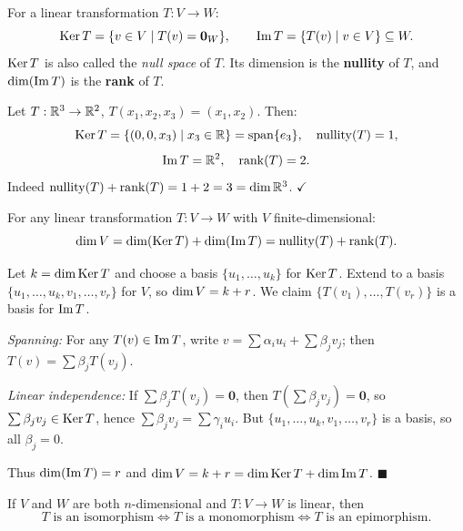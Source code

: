 \begin{defbox}
\label{def:lt-ker-img}
For a linear transformation $T:V\to W$:
\[
    \operatorname{Ker} T = \{v\in V \mid T(v)=\mathbf{0}_W\}, \qquad
    \operatorname{Im} T  = \{T(v) \mid v\in V\} \subseteq W.
\]
$\operatorname{Ker} T$ is also called the \emph{null space} of $T$.  Its dimension is the
\textbf{nullity} of $T$, and $\operatorname{dim}(\operatorname{Im} T)$ is the \textbf{rank} of $T$.
\end{defbox}

\begin{exbox}
Let $T:\mathbb{R}^3\to\mathbb{R}^2$, $T(x_1,x_2,x_3)=(x_1,x_2)$.  Then:
\[
    \operatorname{Ker} T = \{(0,0,x_3)\mid x_3\in\mathbb{R}\} = \operatorname{span}\{e_3\},
    \quad \operatorname{nullity}(T)=1,
\]
\[
    \operatorname{Im} T = \mathbb{R}^2, \quad \operatorname{rank}(T)=2.
\]
Indeed $\operatorname{nullity}(T)+\operatorname{rank}(T)=1+2=3=\operatorname{dim}\mathbb{R}^3$. $\checkmark$
\end{exbox}

\begin{thmbox}
\label{thm:rank-nullity-lt}
For any linear transformation $T:V\to W$ with $V$ finite-dimensional:
\[
    \operatorname{dim} V = \operatorname{dim}(\operatorname{Ker} T) + \operatorname{dim}(\operatorname{Im} T)
            = \operatorname{nullity}(T) + \operatorname{rank}(T).
\]
\end{thmbox}

\begin{proofbox}
Let $k=\operatorname{dim}\operatorname{Ker} T$ and choose a basis $\{u_1,\ldots,u_k\}$ for $\operatorname{Ker} T$.
Extend to a basis $\{u_1,\ldots,u_k,v_1,\ldots,v_r\}$ for $V$, so
$\operatorname{dim} V=k+r$.  We claim $\{T(v_1),\ldots,T(v_r)\}$ is a basis for $\operatorname{Im} T$.

\textit{Spanning:} For any $T(v)\in\operatorname{Im} T$, write $v=\sum\alpha_i u_i+\sum\beta_j v_j$;
then $T(v)=\sum\beta_j T(v_j)$.

\textit{Linear independence:} If $\sum\beta_j T(v_j)=\mathbf{0}$, then
$T(\sum\beta_j v_j)=\mathbf{0}$, so $\sum\beta_j v_j\in\operatorname{Ker} T$, hence
$\sum\beta_j v_j=\sum\gamma_i u_i$.  But $\{u_1,\ldots,u_k,v_1,\ldots,v_r\}$ is a
basis, so all $\beta_j=0$.

Thus $\operatorname{dim}(\operatorname{Im} T)=r$ and $\operatorname{dim} V=k+r=\operatorname{dim}\operatorname{Ker} T+\operatorname{dim}\operatorname{Im} T$.
\hfill$\blacksquare$
\end{proofbox}

\begin{corbox}
\label{cor:mono-epi-iso}
If $V$ and $W$ are both $n$-dimensional and $T:V\to W$ is linear, then
\[
    T \text{ is an isomorphism}
    \iff T \text{ is a monomorphism}
    \iff T \text{ is an epimorphism}.
\]
\end{corbox}

